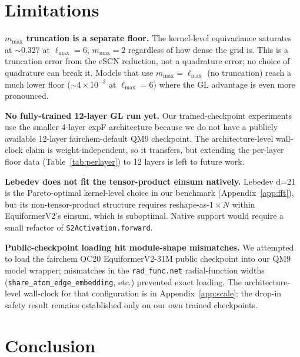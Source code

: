 \documentclass{article}
\begin{document}
\section{Limitations}
\label{sec:limitations}

\textbf{$m_{\max}$ truncation is a separate floor.} The kernel-level
equivariance saturates at $\sim 0.327$ at $\ell_{\max}{=}6$,
$m_{\max}{=}2$ regardless of how dense the grid is. This is a
truncation error from the eSCN reduction, not a quadrature error;
no choice of quadrature can break it. Models that use
$m_{\max}{=}\ell_{\max}$ (no truncation) reach a much lower floor
($\sim 4 \times 10^{-3}$ at $\ell_{\max}{=}6$) where the GL advantage
is even more pronounced.

\textbf{No fully-trained 12-layer GL run yet.} Our trained-checkpoint
experiments use the smaller 4-layer expF architecture because we do
not have a publicly available 12-layer fairchem-default QM9 checkpoint.
The architecture-level wall-clock claim is weight-independent, so it
transfers, but extending the per-layer floor data
(Table~\ref{tab:perlayer}) to 12 layers is left to future work.

\textbf{Lebedev does not fit the tensor-product einsum natively.}
Lebedev d=21 is the Pareto-optimal kernel-level choice in our
benchmark (Appendix~\ref{app:fft}), but its non-tensor-product
structure requires reshape-as-$1{\times}N$ within EquiformerV2's
einsum, which is suboptimal. Native support would require a small
refactor of \texttt{S2Activation.forward}.

\textbf{Public-checkpoint loading hit module-shape mismatches.} We
attempted to load the fairchem OC20 EquiformerV2-31M public
checkpoint into our QM9 model wrapper; mismatches in the
\texttt{rad\_func.net} radial-function widths
(\texttt{share\_atom\_edge\_embedding}, etc.) prevented exact
loading. The architecture-level wall-clock for that configuration is
in Appendix~\ref{app:scale}; the drop-in safety result remains
established only on our own trained checkpoints.

\section{Conclusion}
\label{sec:conclusion}
\end{document}
